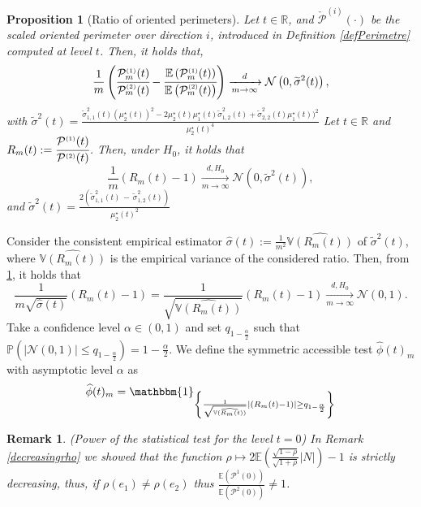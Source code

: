 \documentclass[12pt]{article}
\renewcommand{\tilde}{\widetilde}
\renewcommand{\hat}{\widehat}
\theoremstyle{Theorem}
\newtheorem{Proposition}[Theorem]{Proposition}
\newtheorem{remark}{Remark}
\begin{document}
\begin{Proposition}[Ratio of oriented perimeters]\label{deltamethodgeneralprop} 
Let  $t \in \mathbb{R}$, and $\check{\mathcal{P}}^{\scriptscriptstyle  (i) }(\cdot)$ be the scaled oriented perimeter over direction $i$, introduced in Definition \ref{defPerimetre} computed at level $t$. Then, it holds that,
\begin{equation*}
\frac{1}{m}\left(\cfrac{\mathcal{P}^{\scriptscriptstyle  (1) }_{m}(t)}{\mathcal{P}^{\scriptscriptstyle  (2)}_{m}(t)} - \cfrac{\mathbb{E}\left(\mathcal{P}^{\scriptscriptstyle  (1) }_{m}(t)\right)}{\mathbb{E}\left(\mathcal{P}^{\scriptscriptstyle  (2)}_{m}(t)\right)} \right)  \xrightarrow[m \to \infty]{d} \mathcal{N}\left(0,  \tilde{\sigma}^{2}(t) \right),
\end{equation*}
with $\tilde{\sigma}^{2}(t) = \frac{\tilde{\sigma}_{\scriptscriptstyle 1,1}^{2}(t)(\mu^{\star}_{2}(t))^{2} - 2\mu^{\star}_{2}(t)\mu^{\star}_{1}(t)\tilde{\sigma}_{\scriptscriptstyle 1,2}^{2}(t) +\tilde{\sigma}_{\scriptscriptstyle 2,2}^{2}(t)\mu^{\star}_{1}(t))^{2}}{\mu^{\star}_{2}(t)^4}$
Let $t \in \mathbb{R}$  and  $R_{m}(t) := \cfrac{\mathcal{P}^{\scriptscriptstyle  (1) }(t)}{\mathcal{P}^{\scriptscriptstyle  (2) }(t)}$. Then, under $H_{0}$, it holds that
\begin{equation}\label{ratiounderH0}
\frac{1}{m}\left(R_{m}(t) - 1 \right)  \xrightarrow[m \to \infty]{d, H_0} \mathcal{N}\left(0,  \tilde{\sigma}^{2}(t)  \right),
\end{equation}
and $\tilde{\sigma}^{2}(t) = \frac{2\left(\tilde{\sigma}_{\scriptscriptstyle 1,1}^{2}(t) \, - \, \tilde{\sigma}_{\scriptscriptstyle 1,2}^{2}(t)\right)}{\mu^{\star}_{2}(t)^2}$
\end{Proposition}
Consider the consistent empirical estimator $\hat{\sigma}(t):= \frac{1}{m^2}\hat{\mathbb{V}\left(R_{m}(t)\right)}$ of $\tilde{\sigma}^{2}(t)$, where $\hat{\mathbb{V}\left(R_{m}(t)\right)}$ is the empirical variance of the considered ratio. Then, from \ref{deltamethodgeneralprop}, it holds that 
$$ \frac{1}{m\sqrt{\hat{\sigma}(t)}}\left(R_{m}(t) - 1 \right) = \frac{1}{\sqrt{\hat{\mathbb{V}\left(R_{m}(t)\right)}}}\left(R_{m}(t) - 1 \right)   \xrightarrow[m \to \infty]{d, H_{0}} \mathcal{N}\left(0, 1 \right).$$
Take a confidence level $\alpha \in (0,1)$ and set $q_{1-\frac{\alpha}{2}}$ such that $\mathbb{P}\left(|\mathcal{N}\left(0,1\right)| \leq  q_{1-\frac{\alpha}{2}} \right) = 1 - \frac{\alpha}{2}$. We define the symmetric accessible test $\hat{\phi}(t)_{m}$ with asymptotic level $\alpha$ as 
\begin{equation}
\label{phihat}
\hat{\phi}(t)_{m}= \mathbbm{1}_{\left\{ \frac{1}{\sqrt{\hat{\mathbb{V}\left(R_{m}(t)\right)}}}\left|\left(R_{m}(t) - 1 \right)\right| \geq q_{1- \frac{\alpha}{2}} \right\}}
\end{equation}
\begin{remark}(Power of the statistical test for the level $t = 0$) In Remark \ref{decreasingrho} we showed that the function $\rho \mapsto 2\mathbb{E}\left(\frac{\sqrt{1-\rho}}{\sqrt{1+\rho}}|N|\right) - 1 $ is strictly decreasing, thus, if $\rho(e_1) \neq \rho(e_2)$ thus $\frac{\mathbb{E}\left(\mathcal{P}^{1}(0)\right)}{\mathbb{E}\left(\mathcal{P}^{2}(0)\right)} \neq 1$. 
\end{remark}
\end{document}
